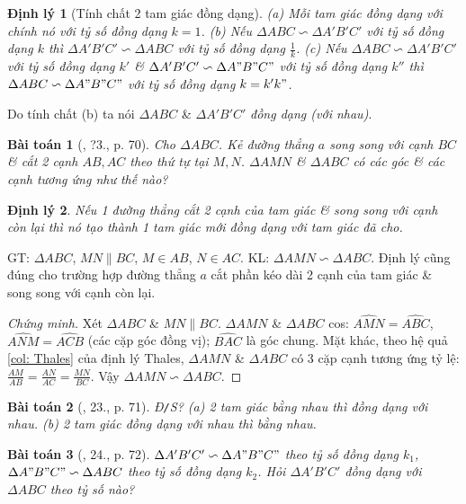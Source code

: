 \documentclass{article}
\newtheorem{baitoan}{Bài toán}
\newtheorem{dinhly}{Định lý}
\begin{document}
\begin{dinhly}[Tính chất 2 tam giác đồng dạng]
	(a) Mỗi tam giác đồng dạng với chính nó với tỷ số đồng dạng $k = 1$. (b) Nếu $\Delta ABC\backsim\Delta A'B'C'$ với tỷ số đồng dạng $k$ thì $\Delta A'B'C'\backsim\Delta ABC$ với tỷ số đồng dạng $\frac{1}{k}$. (c) Nếu $\Delta ABC\backsim\Delta A'B'C'$ với tỷ số đồng dạng $k'$ \& $\Delta A'B'C'\backsim\Delta A"B"C"$ với tỷ số đồng dạng $k''$ thì $\Delta ABC\backsim\Delta A"B"C"$ với tỷ số đồng dạng $k = k'k"$.
\end{dinhly}
Do tính chất (b) ta nói $\Delta ABC$ \& $\Delta A'B'C'$ \textit{đồng dạng (với nhau)}.

\begin{baitoan}[\cite{SGK_Toan_8_tap_2}, ?3., p. 70]
	Cho $\Delta ABC$. Kẻ đường thẳng $a$ song song với cạnh $BC$ \& cắt 2 cạnh $AB,AC$ theo thứ tự tại $M,N$. $\Delta AMN$ \& $\Delta ABC$ có các góc \& các cạnh tương ứng như thế nào?
\end{baitoan}

\begin{dinhly}
	Nếu 1 đường thẳng cắt 2 cạnh của tam giác \& song song với cạnh còn lại thì nó tạo thành 1 tam giác mới đồng dạng với tam giác đã cho.
\end{dinhly}
GT: $\Delta ABC$, $MN\parallel BC$, $M\in AB$, $N\in AC$. KL: $\Delta AMN\backsim\Delta ABC$. Định lý cũng đúng cho trường hợp đường thẳng $a$ cắt phần kéo dài 2 cạnh của tam giác \& song song với cạnh còn lại.

\begin{proof}[Chứng minh]
	Xét $\Delta ABC$ \& $MN\parallel BC$. $\Delta AMN$ \& $\Delta ABC$ cos: $\widehat{AMN} = \widehat{ABC}$, $\widehat{ANM} = \widehat{ACB}$ (các cặp góc đồng vị); $\widehat{BAC}$ là góc chung. Mặt khác, theo hệ quả \ref{col: Thales} của định lý Thales, $\Delta AMN$ \& $\Delta ABC$ có 3 cặp cạnh tương ứng tỷ lệ: $\frac{AM}{AB} = \frac{AN}{AC} = \frac{MN}{BC}$. Vậy $\Delta AMN\backsim\Delta ABC$.
\end{proof}

\begin{baitoan}[\cite{SGK_Toan_8_tap_2}, 23., p. 71]
	\emph{Đ\texttt{/}S?} (a) 2 tam giác bằng nhau thì đồng dạng với nhau. (b) 2 tam giác đồng dạng với nhau thì bằng nhau.
\end{baitoan}

\begin{baitoan}[\cite{SGK_Toan_8_tap_2}, 24., p. 72]
	$\Delta A'B'C'\backsim\Delta A"B"C"$ theo tỷ số đồng dạng $k_1$, $\Delta A"B"C"\backsim\Delta ABC$ theo tỷ số đồng dạng $k_2$. Hỏi $\Delta A'B'C'$ đồng dạng với $\Delta ABC$ theo tỷ số nào?
\end{baitoan}
\end{document}
